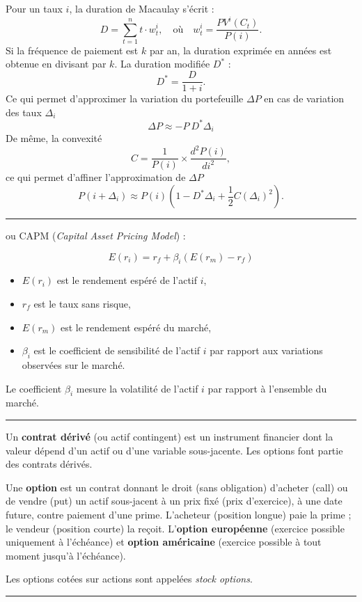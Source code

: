 \begin{f}

Pour un taux \(i\), la duration de Macaulay s'écrit :
\[ 		
D = \sum_{t=1}^{n} t \cdot w^i_t, \quad \text{où} \quad w^i_t = \frac{PV^i(C_t)}{P(i)}.
 \]	
Si la fréquence de paiement est \(k\) par an, la duration exprimée en années est obtenue en divisant par \(k\).
La duration modifiée \(D^*\)  :
\[ 	
D^* = \frac{D}{1 + i}.
 \]
 Ce qui permet d'approximer la variation du portefeuille \(\Delta P\) en cas de variation des taux \(\Delta_i\)
\[ 
\Delta P \approx -P\ D^* \Delta_i 
 \]
De même, la convexité
\[ 	
C = \frac{1}{P(i)} \times \frac{d^2 P(i)}{di^2},
 \]
 ce qui permet d’affiner l'approximation de \(\Delta P\)
\[ 	
P(i + \Delta_i) \approx P(i) \left( 1 -D^*\Delta_i + \frac{1}{2} C (\Delta_i)^2 \right).
 \]
\end{f}
\hrule



\begin{f}[MEDAF]
  ou CAPM (\textit{Capital Asset Pricing Model})  :

\[
E(r_i) = r_f + \beta_i (E(r_m) - r_f)
\]

\begin{itemize}
    \item \( E(r_i) \) est le rendement espéré de l'actif \( i \),
    \item \( r_f \) est le taux sans risque,
    \item \( E(r_m) \) est le rendement espéré du marché,
    \item \( \beta_i \) est le coefficient de sensibilité de l'actif \( i \) par rapport aux variations observées sur le marché.
\end{itemize}

Le coefficient \( \beta_i \) mesure la volatilité de l'actif \( i \) par rapport à l'ensemble du marché. 

\end{f}
\hrule


\begin{f}

Un \textbf{contrat dérivé} (ou actif contingent) est un instrument financier dont la valeur dépend d’un actif ou d’une variable sous-jacente. Les options font partie des contrats dérivés.


Une \textbf{option} est un contrat donnant le droit (sans obligation) d’acheter (call) ou de vendre (put) un actif sous-jacent à un prix fixé (prix d’exercice), à une date future, contre paiement d’une prime. 
L’acheteur (position longue) paie la prime ; le vendeur (position courte) la reçoit.
L'\textbf{option européenne}  (exercice possible uniquement à l’échéance) et   
 \textbf{option américaine} (exercice possible à tout moment jusqu’à l’échéance).

Les options cotées sur actions sont appelées \textit{stock options}.

\end{f}
\hrule


